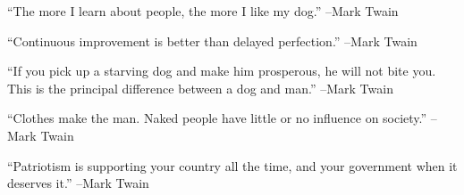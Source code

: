 \documentclass{article}%
\begin{document}
\linebreak%
\vspace{1mm}%
\begin{minipage}{\textwidth}%
\flushleft%
“The more I learn about people, the more I like my dog.”%
\linebreak%
\vspace{1mm}%
–Mark Twain%
\linebreak%
\vspace{1mm}%
\end{minipage}%
\linebreak%
\vspace{1mm}%
\begin{minipage}{\textwidth}%
\flushleft%
“Continuous improvement is better than delayed perfection.”%
\linebreak%
\vspace{1mm}%
–Mark Twain%
\linebreak%
\vspace{1mm}%
\end{minipage}%
\linebreak%
\vspace{1mm}%
\begin{minipage}{\textwidth}%
\flushleft%
“If you pick up a starving dog and make him prosperous, he will not bite you. This is the principal difference between a dog and man.”%
\linebreak%
\vspace{1mm}%
–Mark Twain%
\linebreak%
\vspace{1mm}%
\end{minipage}%
\linebreak%
\vspace{1mm}%
\begin{minipage}{\textwidth}%
\flushleft%
“Clothes make the man. Naked people have little or no influence on society.”%
\linebreak%
\vspace{1mm}%
–Mark Twain%
\linebreak%
\vspace{1mm}%
\end{minipage}%
\linebreak%
\vspace{1mm}%
\begin{minipage}{\textwidth}%
\flushleft%
“Patriotism is supporting your country all the time, and your government when it deserves it.”%
\linebreak%
\vspace{1mm}%
–Mark Twain%
\linebreak%
\vspace{1mm}%
\end{minipage}%
\end{document}
